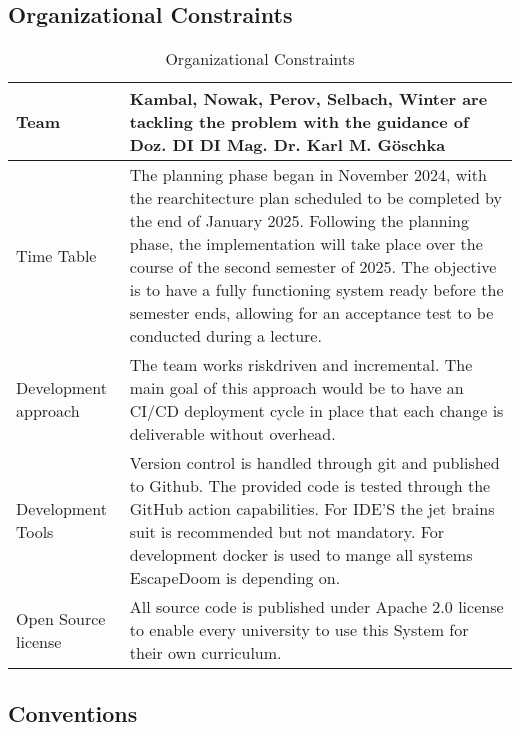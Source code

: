 \subsection{Organizational Constraints}
\label{subsection:organizational-constraints}
\begin{table}[h!tbp]
    \centering
    \begin{tabularx}{1\textwidth} {
        | >{\raggedright\arraybackslash}X
        | >{\raggedleft\arraybackslash}X | }
        \hline
         Team & Kambal, Nowak, Perov, Selbach, Winter are tackling the problem with the guidance of Doz. DI DI Mag. Dr. Karl M. Göschka \\
        \hline
         Time Table & The planning phase began in November 2024, with the rearchitecture plan scheduled to be completed by the end of January 2025. Following the planning phase, the implementation will take place over the course of the second semester of 2025. The objective is to have a fully functioning system ready before the semester ends, allowing for an acceptance test to be conducted during a lecture. \\
         \hline
         Development approach & The team works riskdriven and incremental. The main goal of this approach would be to have an CI/CD deployment cycle in place that each change is deliverable without overhead. \\
         \hline
         Development Tools & Version control is handled through git and published to Github. The provided code is tested through the GitHub action capabilities. For IDE'S the jet brains suit is recommended but not mandatory. For development docker is used to mange all systems EscapeDoom is depending on. \\
         \hline 
         Open Source license & All source code is published under Apache 2.0 license to enable every university to use this System for their own curriculum. \\
         \hline
    \end{tabularx}
    \caption{Organizational Constraints}
    \label{tab:organizational-constraints}
\end{table}

\newpage

\subsection{Conventions}
\label{subsection:conventions}

